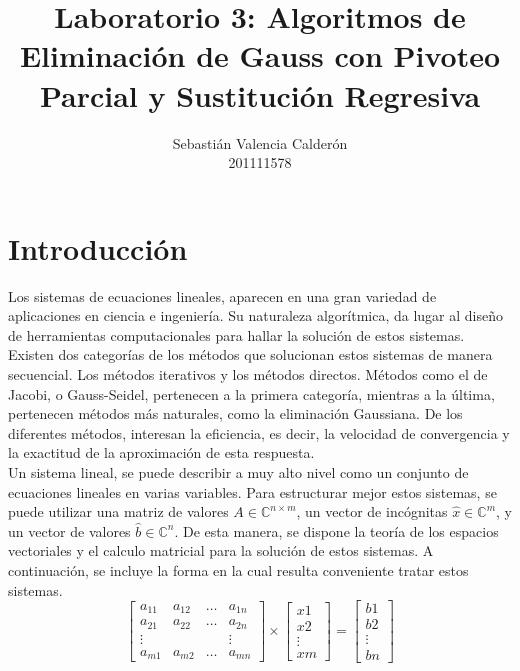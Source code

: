 \documentclass[11pt, spanish]{article}
\date{}
\begin{document}
\renewcommand\lstlistlistingname{Lista de Scripts}

\author{Sebastián Valencia Calderón \\ 201111578}
\title{Laboratorio 3: Algoritmos de Eliminación de Gauss con Pivoteo Parcial y Sustitución Regresiva}
\maketitle

\section{Introducción}

Los sistemas de ecuaciones lineales, aparecen en una gran variedad de aplicaciones en ciencia e ingeniería. Su naturaleza algorítmica, da lugar al diseño de herramientas computacionales para hallar la solución de estos sistemas. Existen dos categorías de los métodos que solucionan estos sistemas de manera secuencial. Los métodos iterativos y los métodos directos. Métodos como el de Jacobi, o Gauss-Seidel, pertenecen a la primera categoría, mientras a la última, pertenecen métodos más naturales, como la eliminación Gaussiana. De los diferentes métodos, interesan la eficiencia, es decir, la velocidad de convergencia y la exactitud de la aproximación de esta respuesta.\\

Un sistema lineal, se puede describir a muy alto nivel como un conjunto de ecuaciones lineales en varias variables. Para estructurar mejor estos sistemas, se puede utilizar una matriz de valores $ A \in \mathbb{C}^{n \times m}$, un vector de incógnitas $\hat{x} \in \mathbb{C}^{m}$, y un vector de valores $\hat{b} \in \mathbb{C}^{n}$. De esta manera, se dispone la teoría de los espacios vectoriales y el calculo matricial para la solución de estos sistemas. A continuación, se incluye la forma en la cual resulta conveniente tratar estos sistemas. \\

$$
\begin{bmatrix} 
	a_{11} & a_{12} & \dots & a_{1n} \\ 
	a_{21} & a_{22} & \dots & a_{2n} \\
	\vdots & & & \vdots \\
	a_{m1} & a_{m2} & \dots & a_{mn}
\end{bmatrix} 
\times 
\left[ 
	\begin{array}{c} 
	x1 \\ 
	x2 \\
	\vdots \\
	xm 
	\end{array} 
\right] = 
\left[ 
	\begin{array}{c} 
	b1 \\ 
	b2 \\
	\vdots \\
	bn 
	\end{array} 
\right]
$$\\
\end{document}
